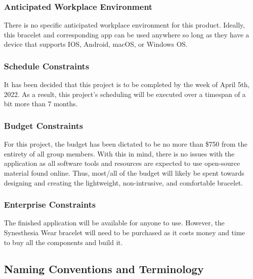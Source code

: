 \documentclass[12pt]{article}
\begin{document}
\subsubsection{Anticipated Workplace Environment}
There is no specific anticipated workplace environment for this product. Ideally, this 
bracelet and corresponding app can be used anywhere so long as they have a device that 
supports IOS, Android, macOS, or Windows OS.

\subsubsection{Schedule Constraints}
It has been decided that this project is to be completed by the week of April 5th, 2022.
As a result, this project's scheduling will be executed over a timespan of a bit more 
than 7 months.

\subsubsection{Budget Constraints}
For this project, the budget has been dictated to be no more than \$750 from the entirety 
of all group members. With this in mind, there is no issues with the application as all 
software tools and resources are expected to use open-source material found online. Thus, 
most/all of the budget will likely be spent towards designing and creating the lightweight, 
non-intrusive, and comfortable bracelet.

\subsubsection{Enterprise Constraints}
The finished application will be available for anyone to use. However, the Synesthesia Wear 
bracelet will need to be purchased as it costs money and time to buy all the components and 
build it. 

\subsection{Naming Conventions and Terminology}
\end{document}
